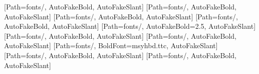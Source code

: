 \def\FontsPath{fonts/}

\def\FontsPath{fonts/}
\def\CJKFontOptions{Path=\FontsPath, AutoFakeBold, AutoFakeSlant}
\def\CJKFontFamilyOptions{Path=\FontsPath, BoldFont=*, ItalicFont=*, BoldItalicFont=*}
[\CJKFontOptions]
[\CJKFontOptions]
[\CJKFontOptions]
\newCJKfontfamily[zhsong][\CJKFontOptions]
\newCJKfontfamily[zhhei][Path=\FontsPath, AutoFakeBold=2.5, AutoFakeSlant]
\newCJKfontfamily[zhkai][\CJKFontOptions]
\newCJKfontfamily[zhfs][\CJKFontOptions]
\newCJKfontfamily[zhyahei][Path=\FontsPath, BoldFont=msyhbd.ttc, AutoFakeSlant]
\newCJKfontfamily[zhli][\CJKFontOptions]
\newCJKfontfamily[zhiyou][\CJKFontOptions]